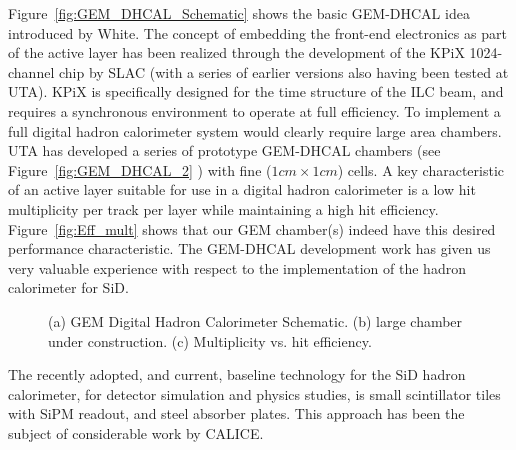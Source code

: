 Figure~\ref{fig:GEM_DHCAL_Schematic} shows the basic GEM-DHCAL idea introduced by White. The concept of embedding the front-end 
electronics as part of the active layer has been realized through the development of the KPiX 1024-channel chip by SLAC (with a series of 
earlier versions also having been tested at UTA). KPiX is specifically designed for the time structure of the ILC beam, and requires a 
synchronous environment to operate at full efficiency. To implement a full digital hadron calorimeter system would clearly require 
large area chambers. UTA has developed a series of prototype GEM-DHCAL chambers (see Figure~\ref{fig:GEM_DHCAL_2} ) with fine ($1cm \times 1cm$) cells. 
A key characteristic of an active layer suitable for use in a digital hadron calorimeter is a low hit multiplicity per track per layer 
while maintaining a high hit efficiency. Figure~\ref{fig:Eff_mult} shows that our GEM chamber(s) indeed have this desired
performance characteristic. The GEM-DHCAL development work has given us very valuable experience with respect to the implementation
of the hadron calorimeter for SiD.

\begin{figure}[htb]
\centering
%
%
\quad
{}
%
%
\quad
{}

\caption{(a) GEM Digital Hadron Calorimeter Schematic. (b) large chamber under construction. 
(c) Multiplicity vs. hit efficiency.}
\end{figure}

The recently adopted, and current, baseline technology for the SiD hadron calorimeter, for detector simulation and physics studies, is small 
scintillator tiles with SiPM readout, and steel absorber plates. This approach has been the subject of considerable work by CALICE. 

